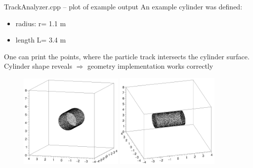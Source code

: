\documentclass{beamer}
\begin{document}
\begin{frame}{TrackAnalyzer.cpp -- plot of example output}
An example cylinder was defined:
\begin{itemize}
\item radius: r= 1.1 m
\item length L= 3.4 m
\end{itemize}
One can print the points, where the particle track intersects the cylinder surface. Cylinder shape reveals $\Rightarrow$ geometry implementation works correctly
\begin{figure}
\includegraphics[width=0.45\textwidth]{images/cylinder1.png}%
\includegraphics[width=0.45\textwidth]{images/cylinder2.png}%
\end{figure}
\end{frame}
\end{document}
